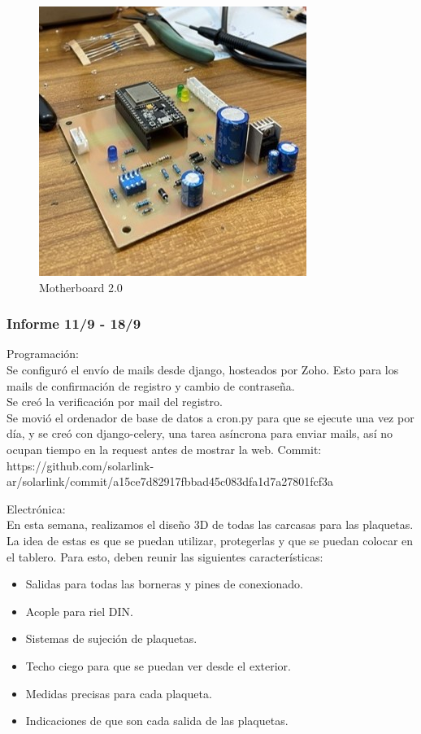 \begin{figure}[H]
    \centering
    \includegraphics[width=0.75\linewidth]{informes/IMG_8937.jpg}
    \caption{Motherboard 2.0}
\end{figure}

\subsubsection{Informe 11/9 - 18/9}

Programación:\\
Se configuró el envío de mails desde django, hosteados por Zoho. Esto para los mails de confirmación de registro y cambio de contraseña.\\

Se creó la verificación por mail del registro.\\
Se movió el ordenador de base de datos a cron.py para que se ejecute una vez por día, y se creó con django-celery, una tarea asíncrona para enviar mails, así no ocupan tiempo en la request antes de mostrar la web. Commit:\\
https://github.com/solarlink-\\ar/solarlink/commit/a15ce7d82917fbbad45c083dfa1d7a27801fcf3a

Electrónica:\\

En esta semana, realizamos el diseño 3D de todas las carcasas para las plaquetas. La idea de estas es que se puedan utilizar, protegerlas y que se puedan colocar en el tablero. Para esto, deben reunir las siguientes características:\\
\begin{itemize}
    \item Salidas para todas las borneras y pines de conexionado.
    \item Acople para riel DIN.
    \item Sistemas de sujeción de plaquetas.
    \item Techo ciego para que se puedan ver desde el exterior.
    \item Medidas precisas para cada plaqueta.
    \item Indicaciones de que son cada salida de las plaquetas.
\end{itemize}


